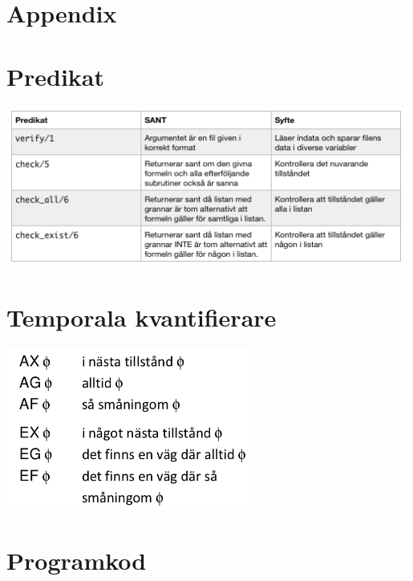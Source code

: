 \documentclass[]{article}
\begin{document}
\clearpage
\section*{Appendix}
\appendix

\section{Predikat}

\includegraphics[width=0.99\textwidth]{Predikat.png}

\section{Temporala kvantifierare}
\includegraphics[width=0.6\textwidth]{semantik.png}

\section{Programkod}
\end{document}
